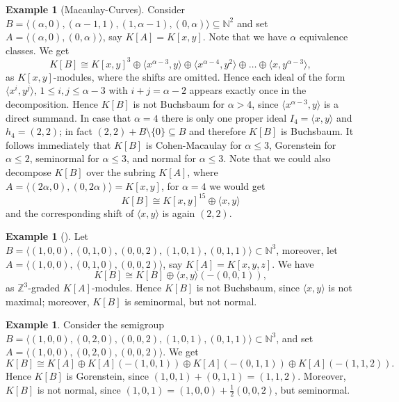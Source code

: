 \documentclass[11pt,a4paper]{amsart}%
\theoremstyle{definition}
\newtheorem{example}[theorem]{Example}
\theoremstyle{remark}
\numberwithin{equation}{section}
\theoremstyle{plain}
\begin{document}
\begin{example}[Macaulay-Curves]

Consider $B=\langle(\alpha,0), (\alpha-1,1), (1,\alpha-1), (0,\alpha)\rangle\subseteq \mathbb N^2$ and set $A=\langle(\alpha,0),(0,\alpha)\rangle$, say $K[A]=K[x,y]$. Note that we have $\alpha$ equivalence classes. We get
\[
K[B]\cong K[x,y]^{3}\oplus\langle x^{\alpha-3},y\rangle\oplus\langle
x^{\alpha-4},y^{2}\rangle\oplus\ldots\oplus\langle x,y^{\alpha-3}\rangle,
\]
as $K[x,y]$-modules, where the shifts are omitted. Hence each ideal of the form $\langle x^{i},y^{j}\rangle$, $1\leq i,j\leq\alpha-3$ with $i+j=\alpha-2$ appears exactly once in the decomposition. Hence $K[B]$ is not Buchsbaum for $\alpha>4$, since $\langle x^{\alpha-3},y\rangle$ is a direct summand. In case that $\alpha=4$ there is only one proper ideal $I_{4}=\langle x,y\rangle$ and $h_{4}=(2,2)$; in fact $(2,2)+B\setminus\{0\}\subseteq B$ and therefore $K[B]$ is Buchsbaum. It follows immediately that $K[B]$ is Cohen-Macaulay for $\alpha\leq3$, Gorenstein for $\alpha\leq2$, seminormal for $\alpha\leq3$, and normal for $\alpha\leq3$. Note that we could also decompose $K[B]$ over the subring $K[A]$, where $A=\langle(2\alpha,0),(0,2\alpha)\rangle=K[x,y]$, for $\alpha=4$ we would get
\[
K[B]\cong K[x,y]^{15} \oplus\langle x,y\rangle
\]
and the corresponding shift of $\langle x,y\rangle$ is again $(2,2)$.
\end{example}




\begin{example}[\cite{PHDPL}]

Let $B=\langle(1,0,0),(0,1,0),(0,0,2),(1,0,1),(0,1,1)\rangle\subset\mathbb N^3$, moreover, let \mbox{$A=\langle(1,0,0),(0,1,0),(0,0,2)\rangle$}, say $K[A]=K[x,y,z]$. We have
\[
K[B]\cong K[B]\oplus\langle x,y\rangle(-(0,0,1)),
\]
as $\mathbb{Z}^{3}$-graded $K[A]$-modules. Hence $K[B]$ is not Buchsbaum,
since $\langle x,y\rangle$ is not maximal; moreover, $K[B]$ is seminormal, but not normal.

\end{example}




\begin{example}
\label{ex gorenstein}
Consider the semigroup $B=\langle(1,0,0),(0,2,0),(0,0,2),(1,0,1),(0,1,1)\rangle\subset\mathbb N^3$, and set $A=\langle(1,0,0),(0,2,0),(0,0,2)\rangle$. We get
\[
K[B]\cong K[A]\oplus K[A](-(1,0,1))\oplus K[A](-(0,1,1))\oplus K[A](-(1,1,2)).
\]
Hence $K[B]$ is Gorenstein, since $(1,0,1)+(0,1,1)=(1,1,2)$. Moreover, $K[B]$ is not normal, since $(1,0,1)=(1,0,0)+\frac{1}{2}(0,0,2)$, but seminormal.

\end{example}
\end{document}
